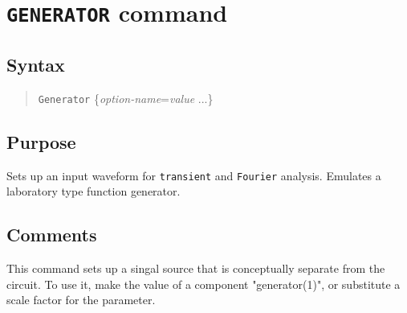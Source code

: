 %
%
%
%
\section{{\tt GENERATOR} command}
\subsection{Syntax}
\begin{verse}
{\tt Generator} \{{\it option-name}={\it value} ...\}
\end{verse}
\subsection{Purpose}

Sets up an input waveform for {\tt transient} and {\tt Fourier} analysis.
Emulates a laboratory type function generator.
\subsection{Comments}

This command sets up a singal source that is conceptually separate
from the circuit.  To use it, make the value of a component
"generator(1)", or substitute a scale factor for the parameter.

